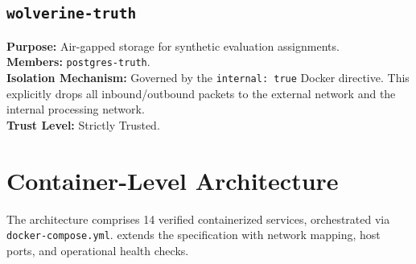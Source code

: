 \subsection{\texttt{wolverine-truth}}
\textbf{Purpose:} Air-gapped storage for synthetic evaluation assignments. \\
\textbf{Members:} \texttt{postgres-truth}. \\
\textbf{Isolation Mechanism:} Governed by the \texttt{internal: true} Docker directive. This explicitly drops all inbound/outbound packets to the external network and the internal processing network. \\
\textbf{Trust Level:} Strictly Trusted.

\section{Container-Level Architecture}
\label{sec:arch-containers}
The architecture comprises 14 verified containerized services, orchestrated via \texttt{docker-compose.yml}.  extends the specification with network mapping, host ports, and operational health checks.

